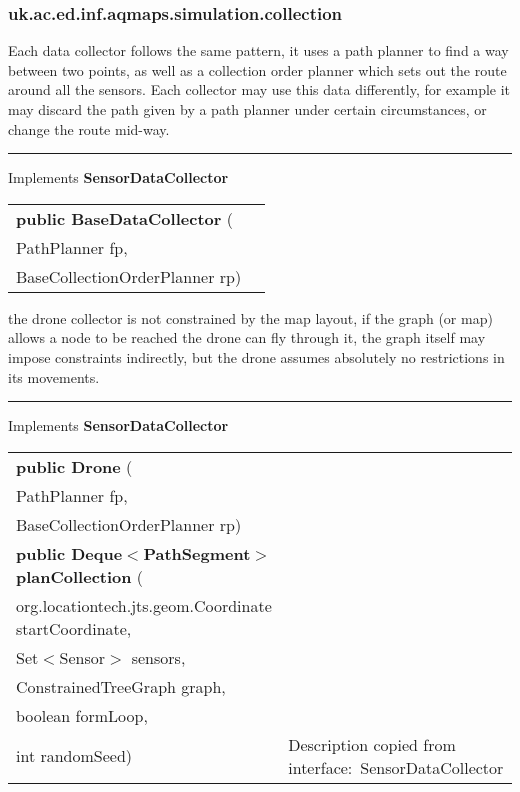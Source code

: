 \subsubsection{ uk.ac.ed.inf.aqmaps.simulation.collection }
 { Each data collector follows the same pattern, it uses a path planner to find a way between two points, as well as a collection order planner which\newline%
 sets out the route around all the sensors. Each collector may use this data differently, for example it may discard the path given by a path planner under certain circumstances,\newline%
 or change the route mid{-}way.
 
\vspace*{4pt} \hrule \vspace*{3pt}
Implements \textbf{ SensorDataCollector }
\begin{tabular}{ p{3in}|m{3.4in}}
\textbf{public BaseDataCollector } (\\ \hspace*{ 5pt} PathPlanner fp,\\\hspace*{ 5pt} BaseCollectionOrderPlanner rp) & \\ \hline 
\end{tabular}
}
 { the drone collector is not constrained by the map layout, if the graph (or map) allows a node to be reached\newline%
 the drone can fly through it, the graph itself may impose constraints indirectly, but the drone assumes absolutely no restrictions in its movements.
 
\vspace*{4pt} \hrule \vspace*{3pt}
Implements \textbf{ SensorDataCollector }
\begin{tabular}{ p{3in}|m{3.4in}}
\textbf{public Drone } (\\ \hspace*{ 5pt} PathPlanner fp,\\\hspace*{ 5pt} BaseCollectionOrderPlanner rp) & \\ \hline 
\textbf{public Deque$<$PathSegment$>$ planCollection } (\\ \hspace*{ 5pt} org.locationtech.jts.geom.Coordinate startCoordinate,\\\hspace*{ 5pt} Set$<$Sensor$>$ sensors,\\\hspace*{ 5pt} ConstrainedTreeGraph graph,\\\hspace*{ 5pt} boolean formLoop,\\\hspace*{ 5pt} int randomSeed) & Description copied from interface:~SensorDataCollector\\ \hline 
\end{tabular}
}
